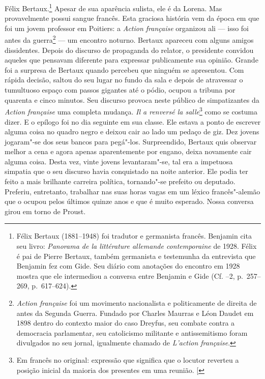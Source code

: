Félix Bertaux.\footnote{Félix Bertaux (1881--1948) foi tradutor e germanista francês. Benjamin cita seu livro:  \emph{Panorama de la littérature allemande contemporaine} de 1928. Félix é pai de Pierre Bertaux, também germanista e testemunha da entrevista que Benjamin fez com Gide. Seu diário com anotações do encontro em 1928 mostra que ele intermediou a conversa entre Benjamin e Gide (Cf. --2, p.~257--269, p.~617--624). \versal{[N.~O.]}} Apesar de sua aparência sulista,
ele é da Lorena. Mas provavelmente possui sangue francês. Esta graciosa
história vem da época em que foi um jovem professor em Poitiers: a
\emph{Action française} organizou ali --- isso foi antes da
guerra\footnote{\emph{Action française} foi um movimento %
  nacionalista e politicamente de direita de antes da Segunda Guerra.
  Fundado por Charles Maurras e Léon Daudet em 1898 dentro do
  contexto maior do caso Dreyfus, seu combate contra a democracia
  parlamentar, seu catolicismo militante e antissemitismo foram
  divulgados no seu jornal, igualmente chamado de \emph{L'action
  française}. \versal{[N.~O.]}} --- um encontro noturno. Bertaux apareceu com alguns
amigos dissidentes. Depois do discurso de propaganda do relator, o
presidente convidou aqueles que pensavam diferente para expressar
publicamente sua opinião. Grande foi a surpresa de Bertaux quando
percebeu que ninguém se apresentou. Com rápida decisão, saltou do seu
lugar no fundo da sala e depois de atravessar o tumultuoso espaço com
passos gigantes até o pódio, ocupou a tribuna por quarenta e cinco
minutos. Seu discurso provoca neste público de simpatizantes da
\emph{Action française} uma completa mudança. \emph{Il a renversé la
salle}\footnote{Em francês no original: expressão que significa que o locutor reverteu a posição inicial da maioria dos presentes em uma reunião. {[}\versal{N.~T.}{]}} como se costuma dizer. E o epílogo foi no dia seguinte em sua
classe. Ele estava a ponto de escrever alguma coisa no quadro negro e
deixou cair ao lado um pedaço de giz. Dez jovens jogaram"-se dos seus
bancos para pegá"-los. Surpreendido, Bertaux quis observar melhor a cena
e agora apenas aparentemente por engano, deixa novamente cair alguma
coisa. Desta vez, vinte jovens levantaram"-se, tal era a impetuosa
simpatia que o seu discurso havia conquistado na noite anterior. Ele
podia ter feito a mais brilhante carreira política, tornando"-se
prefeito ou deputado. Preferiu, entretanto, trabalhar nas suas horas vagas
em um léxico francês"-alemão que o ocupou pelos últimos quinze anos e que
é muito esperado. Nossa conversa girou em torno de Proust.
